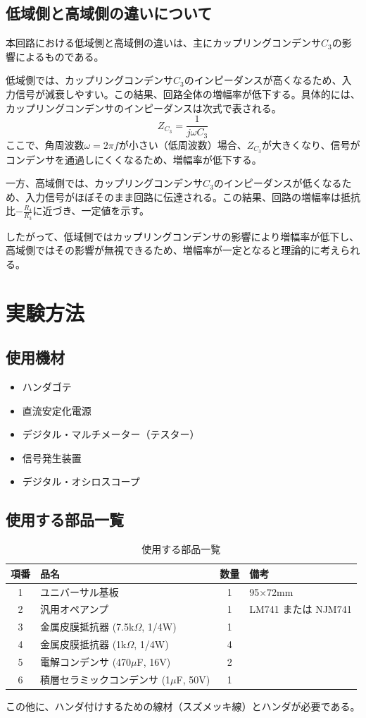 \documentclass{jlreq}
\numberwithin{equation}{section}
\begin{document}
\subsection{低域側と高域側の違いについて}
本回路における低域側と高域側の違いは、主にカップリングコンデンサ\(C_3\)の影響によるものである。

低域側では、カップリングコンデンサ\(C_3\)のインピーダンスが高くなるため、入力信号が減衰しやすい。この結果、回路全体の増幅率が低下する。具体的には、カップリングコンデンサのインピーダンスは次式で表される。
\[
Z_{C_3} = \frac{1}{j\omega C_3}
\]
ここで、角周波数\(\omega = 2\pi f\)が小さい（低周波数）場合、\(Z_{C_3}\)が大きくなり、信号がコンデンサを通過しにくくなるため、増幅率が低下する。

一方、高域側では、カップリングコンデンサ\(C_3\)のインピーダンスが低くなるため、入力信号がほぼそのまま回路に伝達される。この結果、回路の増幅率は抵抗比\(-\frac{R_4}{R_3}\)に近づき、一定値を示す。

したがって、低域側ではカップリングコンデンサの影響により増幅率が低下し、高域側ではその影響が無視できるため、増幅率が一定となると理論的に考えられる。

\section{実験方法}
\subsection{使用機材}
\begin{itemize}
  \item ハンダゴテ
  \item 直流安定化電源
  \item デジタル・マルチメーター（テスター）
  \item 信号発生装置
  \item デジタル・オシロスコープ
\end{itemize}

\subsection{使用する部品一覧}
\begin{table}[H]
  \centering
  \caption{使用する部品一覧}
  \begin{tabular}{|c|l|c|l|}
    \hline
    項番 & 品名 & 数量 & 備考 \\ \hline
    1 & ユニバーサル基板 & 1 & 95×72mm \\ \hline
    2 & 汎用オペアンプ & 1 & LM741 または NJM741 \\ \hline
    3 & 金属皮膜抵抗器 (7.5k\(\Omega\), 1/4W) & 1 & \\ \hline
    4 & 金属皮膜抵抗器 (1k\(\Omega\), 1/4W) & 4 & \\ \hline
    5 & 電解コンデンサ (470\(\mu\)F, 16V) & 2 & \\ \hline
    6 & 積層セラミックコンデンサ (1\(\mu\)F, 50V) & 1 & \\ \hline
  \end{tabular}
\end{table}
この他に、ハンダ付けするための線材（スズメッキ線）とハンダが必要である。
\end{document}
